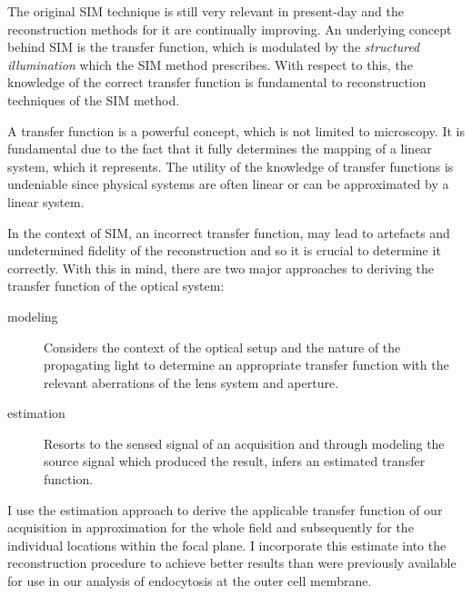 The original \ac{SIM} technique is still very relevant in present-day and the reconstruction methods for it are
    continually improving.
An underlying concept behind \ac{SIM} is the transfer function, which is modulated by the \emph{structured illumination}
    which the \ac{SIM} method prescribes.
With respect to this, the knowledge of the correct transfer function is fundamental to reconstruction techniques of the
    \ac{SIM} method.

A transfer function is a powerful concept, which is not limited to microscopy.
It is fundamental due to the fact that it fully determines the mapping of a linear system, which it represents.
The utility of the knowledge of transfer functions is undeniable since physical systems are often linear or can be
    approximated by a linear system.

In the context of \ac{SIM}, an incorrect transfer function, may lead to artefacts and undetermined fidelity of the 
    reconstruction and so it is crucial to determine it correctly.
With this in mind, there are two major approaches to deriving the transfer function of the optical system:
    \begin{description}
        \item[modeling] Considers the context of the optical setup and the nature of the propagating light to determine
            an appropriate transfer function with the relevant aberrations of the lens system and aperture.
        \item[estimation] Resorts to the sensed signal of an acquisition and through modeling the source signal which 
            produced the result, infers an estimated transfer function.
    \end{description}

I use the estimation approach to derive the applicable transfer function of our acquisition in approximation for the 
    whole field and subsequently for the individual locations within the focal plane.
I incorporate this estimate into the reconstruction procedure to achieve better results than were previously available 
    for use in our analysis of endocytosis at the outer cell membrane.

